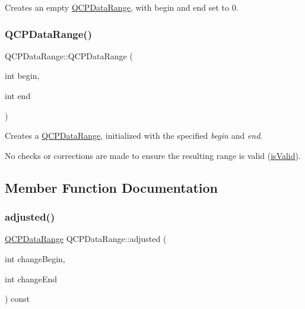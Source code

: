 Creates an empty \hyperlink{classQCPDataRange}{Q\+C\+P\+Data\+Range}, with begin and end set to 0. \mbox{\label{classQCPDataRange_a6c7f4a3684210423270515403060e9cf}} 
\subsubsection{\texorpdfstring{Q\+C\+P\+Data\+Range()}{QCPDataRange()}\hspace{0.1cm}{\footnotesize\ttfamily [2/2]}}
{\footnotesize\ttfamily Q\+C\+P\+Data\+Range\+::\+Q\+C\+P\+Data\+Range (\begin{DoxyParamCaption}\item[{int}]{begin,  }\item[{int}]{end }\end{DoxyParamCaption})}

Creates a \hyperlink{classQCPDataRange}{Q\+C\+P\+Data\+Range}, initialized with the specified {\itshape begin} and {\itshape end}.

No checks or corrections are made to ensure the resulting range is valid (\hyperlink{classQCPDataRange_aae53a37472212dca0a7939963e20dba0}{is\+Valid}). 

\subsection{Member Function Documentation}
\mbox{\label{classQCPDataRange_a279ed36602b39607699dc5652bcaf813}} 
\subsubsection{\texorpdfstring{adjusted()}{adjusted()}}
{\footnotesize\ttfamily \hyperlink{classQCPDataRange}{Q\+C\+P\+Data\+Range} Q\+C\+P\+Data\+Range\+::adjusted (\begin{DoxyParamCaption}\item[{int}]{change\+Begin,  }\item[{int}]{change\+End }\end{DoxyParamCaption}) const\hspace{0.3cm}{\ttfamily [inline]}}

